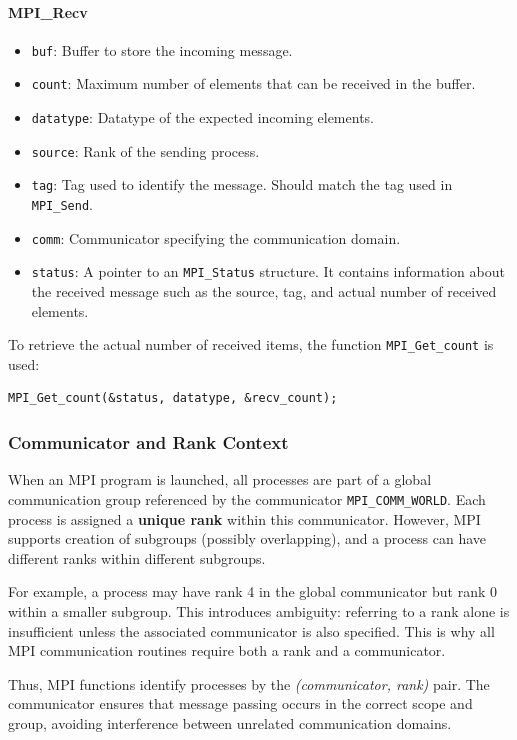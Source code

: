 \documentclass[12pt]{book}
\begin{document}
\paragraph{MPI\_Recv}
\begin{itemize}
    \item \texttt{buf}: Buffer to store the incoming message.
    \item \texttt{count}: Maximum number of elements that can be received in the buffer.
    \item \texttt{datatype}: Datatype of the expected incoming elements.
    \item \texttt{source}: Rank of the sending process.
    \item \texttt{tag}: Tag used to identify the message. Should match the tag used in \texttt{MPI\_Send}.
    \item \texttt{comm}: Communicator specifying the communication domain.
    \item \texttt{status}: A pointer to an \texttt{MPI\_Status} structure. It contains information about the received message such as the source, tag, and actual number of received elements.
\end{itemize}

To retrieve the actual number of received items, the function \texttt{MPI\_Get\_count} is used:
\begin{lstlisting}[style=cppstyle]
MPI_Get_count(&status, datatype, &recv_count);
\end{lstlisting}

\subsubsection*{Communicator and Rank Context}

When an MPI program is launched, all processes are part of a global communication group referenced by the communicator \texttt{MPI\_COMM\_WORLD}. Each process is assigned a \textbf{unique rank} within this communicator. However, MPI supports creation of subgroups (possibly overlapping), and a process can have different ranks within different subgroups.

For example, a process may have rank 4 in the global communicator but rank 0 within a smaller subgroup. This introduces ambiguity: referring to a rank alone is insufficient unless the associated communicator is also specified. This is why all MPI communication routines require both a rank and a communicator.

Thus, MPI functions identify processes by the \textit{(communicator, rank)} pair. The communicator ensures that message passing occurs in the correct scope and group, avoiding interference between unrelated communication domains.
\end{document}
